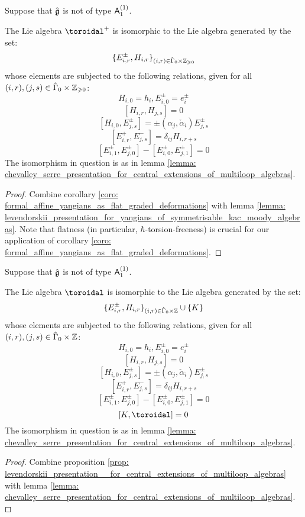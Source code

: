         \begin{proposition} \label{prop: levendorskii_presentation__for_central_extensions_of_multiloop_algebras}
            Suppose that $\hat{\mathfrak{g}}$ is not of type $\mathsf{A}_1^{(1)}$. 
        
            The Lie algebra $\toroidal^+$ is isomorphic to the Lie algebra  generated by the set:
                $$\{ E_{i, r}^{\pm}, H_{i, r} \}_{(i, r) \in \hat{\Gamma}_0 \x \Z_{\geq 0}}$$
            whose elements are subjected to the following relations, given for all $(i, r), (j, s) \in \hat{\Gamma}_0 \x \Z_{\geq 0}$:
                $$H_{i, 0} = h_i, E_{i, 0}^{\pm} = e_i^{\pm}$$
                $$[ H_{i, r}, H_{j, s} ] = 0$$
                $$[ H_{i, 0}, E_{j, s}^{\pm} ] = \pm (\alpha_j, \check{\alpha}_i) E_{j, s}^{\pm}$$
                $$[ E_{i, r}^+, E_{j, s}^- ] = \delta_{ij} H_{i, r + s}$$
                $$[ E_{i, 1}^{\pm}, E_{j, 0}^{\pm} ] - [ E_{i, 0}^{\pm}, E_{j, 1}^{\pm} ] = 0$$
            The isomorphism in question is as in lemma \ref{lemma: chevalley_serre_presentation_for_central_extensions_of_multiloop_algebras}.
        \end{proposition}
            \begin{proof}
                Combine corollary \ref{coro: formal_affine_yangians_as_flat_graded_deformations} with lemma \ref{lemma: levendorskii_presentation_for_yangians_of_symmetrisable_kac_moody_algebras}. Note that flatness (in particular, $\hbar$-torsion-freeness) is crucial for our application of corollary \ref{coro: formal_affine_yangians_as_flat_graded_deformations}.
            \end{proof}
        \begin{corollary}
            Suppose that $\hat{\mathfrak{g}}$ is not of type $\mathsf{A}_1^{(1)}$. 
        
            The Lie algebra $\toroidal$ is isomorphic to the Lie algebra  generated by the set:
                $$\{ E_{i, r}^{\pm}, H_{i, r} \}_{(i, r) \in \hat{\Gamma}_0 \x \Z} \cup \{ K \}$$
            whose elements are subjected to the following relations, given for all $(i, r), (j, s) \in \hat{\Gamma}_0 \x \Z$:
                $$H_{i, 0} = h_i, E_{i, 0}^{\pm} = e_i^{\pm}$$
                $$[ H_{i, r}, H_{j, s} ] = 0$$
                $$[ H_{i, 0}, E_{j, s}^{\pm} ] = \pm (\alpha_j, \check{\alpha}_i) E_{j, s}^{\pm}$$
                $$[ E_{i, r}^+, E_{j, s}^- ] = \delta_{ij} H_{i, r + s}$$
                $$[ E_{i, 1}^{\pm}, E_{j, 0}^{\pm} ] - [ E_{i, 0}^{\pm}, E_{j, 1}^{\pm} ] = 0$$
                $$[K, \toroidal] = 0$$
            The isomorphism in question is as in lemma \ref{lemma: chevalley_serre_presentation_for_central_extensions_of_multiloop_algebras}.
        \end{corollary}
            \begin{proof}
                Combine proposition \ref{prop: levendorskii_presentation__for_central_extensions_of_multiloop_algebras} with lemma \ref{lemma: chevalley_serre_presentation_for_central_extensions_of_multiloop_algebras}. 
            \end{proof}

